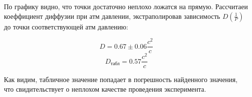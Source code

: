 \documentclass[a4paper,12pt]{article}
\theoremstyle{definition}
\begin{document}
\begin{enumerate}
\begin{figure}[H]
\end{figure}

По графику видно, что точки достаточно неплохо ложатся на прямую. Рассчитаеи коеффициент диффузии при атм давлении, экстраполировав зависимость $D(\frac{1}{P})$ до точки соответствующей атм давлению:

\[D = 0.67 \pm 0.06 \frac{c^2}{c}\]
\[D_\text{табл}=0.57 \frac{c^2}{c}\]

Как видим, табличное значение попадает в погрешность найденного значения, что свидительствует о неплохом качестве проведения эксперимента.

\end{enumerate}
\end{document}
